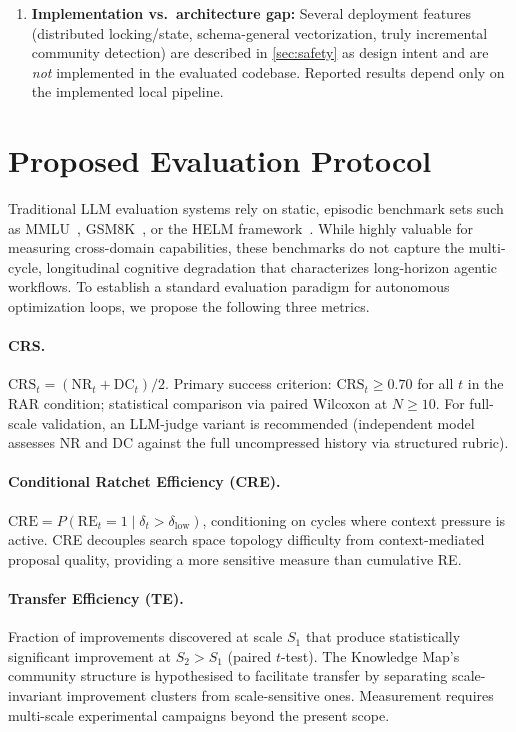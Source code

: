 \documentclass[conference]{IEEEtran}
\newcommand{\dlt}{\delta_t}
\newcommand{\dlow}{\delta_{\mathrm{low}}}
\newcommand{\CRS}{\mathrm{CRS}}
\newcommand{\RE}{\mathrm{RE}}
\newcommand{\NR}{\mathrm{NR}}
\newcommand{\DC}{\mathrm{DC}}
\newcommand{\CRE}{\mathrm{CRE}}
\begin{document}
\begin{enumerate}[label=\textbf{L\arabic*.},leftmargin=2.2em,itemsep=3pt]
  \item \textbf{Implementation vs.\ architecture gap:} Several deployment features (distributed locking/state, schema-general vectorization, truly incremental community detection) are described in \cref{sec:safety} as design intent and are \emph{not} implemented in the evaluated codebase. Reported results depend only on the implemented local pipeline.
\end{enumerate}

\section{Proposed Evaluation Protocol}
\label{sec:eval}

Traditional LLM evaluation systems rely on static, episodic benchmark sets such as MMLU~\citep{hendrycks2020measuring}, GSM8K~\citep{cobbe2021training}, or the HELM framework~\citep{liang2022holistic}. While highly valuable for measuring cross-domain capabilities, these benchmarks do not capture the multi-cycle, longitudinal cognitive degradation that characterizes long-horizon agentic workflows. To establish a standard evaluation paradigm for autonomous optimization loops, we propose the following three metrics.

\paragraph{CRS.}
$\CRS_t = (\NR_t + \DC_t)/2$. Primary success criterion: $\CRS_t \geq 0.70$ for all $t$ in the RAR condition; statistical comparison via paired Wilcoxon at $N{\geq}10$. For full-scale validation, an LLM-judge variant is recommended (independent model assesses NR and DC against the full uncompressed history via structured rubric).

\paragraph{Conditional Ratchet Efficiency (CRE).}
$\CRE = P(\RE_t = 1 \mid \dlt > \dlow)$, conditioning on cycles where context pressure is active. CRE decouples search space topology difficulty from context-mediated proposal quality, providing a more sensitive measure than cumulative RE.

\paragraph{Transfer Efficiency (TE).}
Fraction of improvements discovered at scale $S_1$ that produce statistically significant improvement at $S_2 > S_1$ (paired $t$-test). The Knowledge Map's community structure is hypothesised to facilitate transfer by separating scale-invariant improvement clusters from scale-sensitive ones. Measurement requires multi-scale experimental campaigns beyond the present scope.
\end{document}
